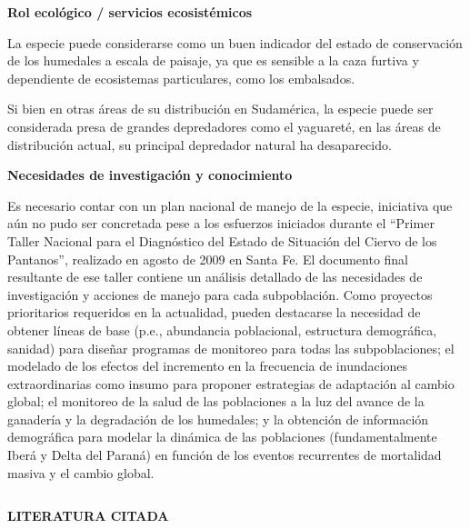 \documentclass[
  x11names]{article}
\begin{document}
\textbf{Rol ecológico / servicios ecosistémicos}

La especie puede considerarse como un buen indicador del estado de
conservación de los humedales a escala de paisaje, ya que es sensible a
la caza furtiva y dependiente de ecosistemas particulares, como los
embalsados.

Si bien en otras áreas de su distribución en Sudamérica, la especie
puede ser considerada presa de grandes depredadores como el yaguareté,
en las áreas de distribución actual, su principal depredador natural ha
desaparecido.

\textbf{Necesidades de investigación y conocimiento}

Es necesario contar con un plan nacional de manejo de la especie,
iniciativa que aún no pudo ser concretada pese a los esfuerzos iniciados
durante el ``Primer Taller Nacional para el Diagnóstico del Estado de
Situación del Ciervo de los Pantanos'', realizado en agosto de 2009 en
Santa Fe. El documento final resultante de ese taller contiene un
análisis detallado de las necesidades de investigación y acciones de
manejo para cada subpoblación. Como proyectos prioritarios requeridos en
la actualidad, pueden destacarse la necesidad de obtener líneas de base
(p.e., abundancia poblacional, estructura demográfica, sanidad) para
diseñar programas de monitoreo para todas las subpoblaciones; el
modelado de los efectos del incremento en la frecuencia de inundaciones
extraordinarias como insumo para proponer estrategias de adaptación al
cambio global; el monitoreo de la salud de las poblaciones a la luz del
avance de la ganadería y la degradación de los humedales; y la obtención
de información demográfica para modelar la dinámica de las poblaciones
(fundamentalmente Iberá y Delta del Paraná) en función de los eventos
recurrentes de mortalidad masiva y el cambio global.


%
\begin{table}[H]
\centering
\begin{tabular}[t]{>{\raggedright\arraybackslash}m{16cm}>{}m{16cm}}
\toprule
\cellcolor{ceil}{\textcolor{white}{\textbf{\rule{0pt}{14pt}BIBLIOGRAFÍA}}}\\
\bottomrule
\end{tabular}
\end{table}

\setlength{\parindent}{20pt}\noindent\textbf{LITERATURA CITADA}
\end{document}
